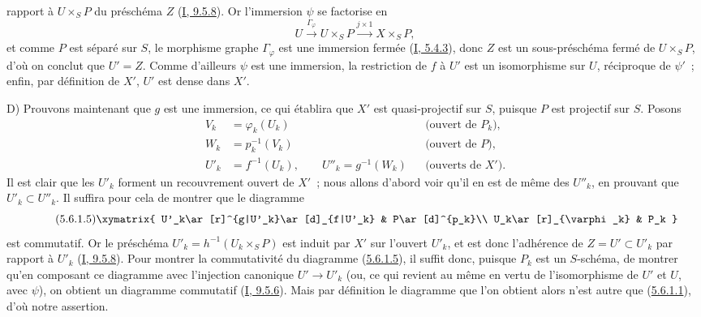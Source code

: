 
rapport à $U\times_SP$ du préschéma $Z$
(\hyperref[I.9.5.8-fr]{I, 9.5.8}). Or l'immersion $\psi$ se factorise en
\[
U\xrightarrow{\Gamma_\varphi}U\times_SP\xrightarrow{j\times1}X\times_SP,
\]
et comme $P$ est séparé sur $S$, le morphisme graphe $\Gamma_\varphi$ est une
immersion fermée (\hyperref[I.5.4.3-fr]{I, 5.4.3}), donc $Z$ est un
sous-préschéma fermé de $U\times_SP$, d'où on conclut que $U'=Z$. Comme
d'ailleurs $\psi$ est une immersion, la restriction de $f$ à $U'$ est un
isomorphisme sur $U$, réciproque de $\psi'$~; enfin, par définition de $X'$,
$U'$ est dense dans $X'$.

D) Prouvons maintenant que $g$ est une immersion, ce qui établira que $X'$ est
quasi-projectif sur $S$, puisque $P$ est projectif sur $S$. Posons
\begin{align*}
V_k&=\varphi_k(U_k) &&\text{(ouvert de $P_k$)},\\
W_k&=p_k^{-1}(V_k) &&\text{(ouvert de $P$)},\\
U'_k&=f^{-1}(U_k),\qquad U''_k=g^{-1}(W_k)
&&\text{(ouverts de $X'$)}.
\end{align*}
Il est clair que les $U'_k$ forment un recouvrement ouvert de $X'$~; nous
allons d'abord voir qu'il en est de même des $U''_k$, en prouvant que
$U'_k\subset U''_k$. Il suffira pour cela de montrer que le diagramme
\[
\tag{5.6.1.5}
\label{II.5.6.1.5-fr}
\xymatrix{
U'_k\ar[r]^{g|U'_k}\ar[d]_{f|U'_k} & P\ar[d]^{p_k}\\
U_k\ar[r]_{\varphi_k} & P_k
}
\]
est commutatif. Or le préschéma $U'_k=h^{-1}(U_k\times_SP)$ est induit par
$X'$ sur l'ouvert $U'_k$, et est donc l'adhérence de $Z=U'\subset U'_k$ par
rapport à $U'_k$ (\hyperref[I.9.5.8-fr]{I, 9.5.8}). Pour montrer la
commutativité du diagramme (\hyperref[II.5.6.1.5-fr]{5.6.1.5}), il suffit
donc, puisque $P_k$ est un $S$-schéma, de montrer qu'en composant ce diagramme
avec l'injection canonique $U'\to U'_k$ (ou, ce qui revient au même en vertu de
l'isomorphisme de $U'$ et $U$, avec $\psi$), on obtient un diagramme commutatif
(\hyperref[I.9.5.6-fr]{I, 9.5.6}). Mais par définition le diagramme que l'on
obtient alors n'est autre que (\hyperref[II.5.6.1.1-fr]{5.6.1.1}), d'où notre
assertion.

